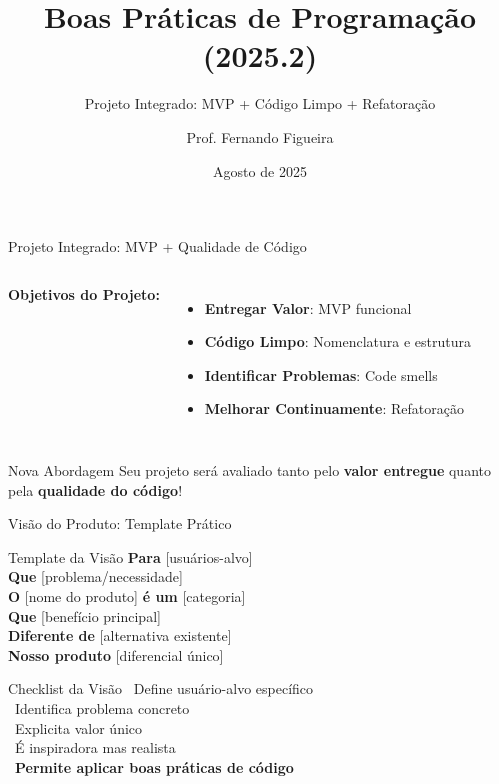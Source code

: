 \documentclass[10pt]{beamer}
\title{Boas Práticas de Programação (2025.2)}
\subtitle{Projeto Integrado: MVP + Código Limpo + Refatoração}
\author{Prof. Fernando Figueira}
\institute{DIMAp - UFRN}
\date{Agosto de 2025}
\begin{document}
\frame{\titlepage}

\begin{frame}{Projeto Integrado: MVP + Qualidade de Código}
\begin{columns}[c]
\textbf{Objetivos do Projeto:}
\begin{itemize}
    \item \textbf{Entregar Valor}: MVP funcional
    \item \textbf{Código Limpo}: Nomenclatura e estrutura
    \item \textbf{Identificar Problemas}: Code smells
    \item \textbf{Melhorar Continuamente}: Refatoração
\end{itemize}

\centering
{}
\end{columns}

\vspace{0.3cm}
\begin{alertblock}{Nova Abordagem}
Seu projeto será avaliado tanto pelo \textbf{valor entregue} quanto pela \textbf{qualidade do código}!
\end{alertblock}
\end{frame}

\begin{frame}{Visão do Produto: Template Prático}
\begin{block}{Template da Visão}
\textbf{Para} [usuários-alvo] \\
\textbf{Que} [problema/necessidade] \\
\textbf{O} [nome do produto] \textbf{é um} [categoria] \\
\textbf{Que} [benefício principal] \\
\textbf{Diferente de} [alternativa existente] \\
\textbf{Nosso produto} [diferencial único]
\end{block}

\vspace{0.3cm}
\begin{exampleblock}{Checklist da Visão}
\small
\checkmark\ Define usuário-alvo específico \\
\checkmark\ Identifica problema concreto \\
\checkmark\ Explicita valor único \\
\checkmark\ É inspiradora mas realista \\
\checkmark\ \textbf{Permite aplicar boas práticas de código}
\end{exampleblock}
\end{frame}
\end{document}
